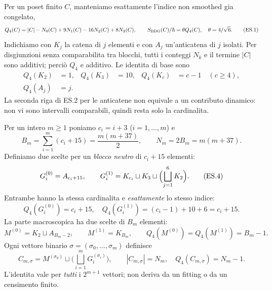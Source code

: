 \documentclass[11pt,a4paper]{article}
\begin{document}
Per un poset finito $C$, manteniamo esattamente l'indice non smoothed gia congelato,
\begin{equation}
 Q_4(C)=|C|-N_0(C)+9N_1(C)-16N_2(C)+8N_3(C),
 \qquad S_{\rm BDG}(C)/\hbar=\theta Q_4(C),\quad \theta=4/\sqrt6.
 \tag{ES.1}
\end{equation}
Indichiamo con $K_j$ la catena di $j$ elementi e con $A_j$ un'anticatena di $j$ isolati. Per disgiunzioni senza comparabilita tra blocchi, tutti i conteggi $N_k$ e il termine $|C|$ sono additivi; perci\`o $Q_4$ e additivo. Le identita di base sono
\begin{equation}
 \begin{aligned}
 Q_4(K_2)&=1,&Q_4(K_3)&=10,& Q_4(K_c)&=c-1 \quad(c\ge4),\\
 Q_4(A_j)&=j.& & &
 \end{aligned}\tag{ES.2}
\end{equation}
La seconda riga di ES.2 per le anticatene non equivale a un contributo dinamico: non vi sono intervalli comparabili, quindi resta solo la cardinalita.

Per un intero $m\ge1$ poniamo $c_i=i+3$ ($i=1,\ldots,m$) e
\begin{equation}
 B_m=\sum_{i=1}^m(c_i+15)=\frac{m(m+37)}{2},\qquad
 N_m=2B_m=m(m+37).\tag{ES.3}
\end{equation}
Definiamo due scelte per un \emph{blocco neutro} di $c_i+15$ elementi:
\begin{equation}
 G_i^{(0)}=A_{c_i+15},\qquad
 G_i^{(1)}=K_{c_i}\sqcup K_3\sqcup\Bigl(\bigsqcup_{j=1}^{6}K_2\Bigr).
 \tag{ES.4}
\end{equation}
Entrambe hanno la stessa cardinalita e \emph{esattamente} lo stesso indice:
\begin{equation}
 Q_4(G_i^{(0)})=c_i+15,
 \quad Q_4(G_i^{(1)})=(c_i-1)+10+6=c_i+15.
 \tag{ES.5}
\end{equation}
La parte macroscopica ha due scelte di $B_m$ elementi:
\begin{equation}
 M^{(0)}=K_2\sqcup A_{B_m-2},\qquad M^{(1)}=K_{B_m},\qquad
 Q_4(M^{(0)})=Q_4(M^{(1)})=B_m-1.
 \tag{ES.6}
\end{equation}
Ogni vettore binario $\sigma=(\sigma_0,\ldots,\sigma_m)$ definisce
\begin{equation}
 \boxed{\ C_{m,\sigma}=M^{(\sigma_0)}\sqcup\biggl(\bigsqcup_{i=1}^m G_i^{(\sigma_i)}\biggr),
 \qquad |C_{m,\sigma}|=N_m,\quad Q_4(C_{m,\sigma})=N_m-1.\ }
 \tag{ES.7}
\end{equation}
L'identita vale per \emph{tutti} i $2^{m+1}$ vettori; non deriva da un fitting o da un censimento finito.
\end{document}
